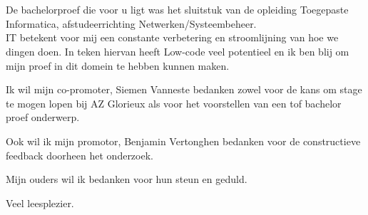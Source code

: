 
\chapter*{}
\label{ch:voorwoord}


De bachelorproef die voor u ligt was het sluitstuk van de opleiding Toegepaste Informatica, afstudeerrichting Netwerken/Systeembeheer.\\
IT betekent voor mij een constante verbetering en stroomlijning van hoe we dingen doen. In teken hiervan heeft Low-code veel potentieel en ik ben blij om mijn proef in dit domein te hebben kunnen maken.

Ik wil mijn co-promoter, Siemen Vanneste bedanken zowel voor de kans om stage te mogen lopen bij AZ Glorieux als voor het voorstellen van een tof bachelor proef onderwerp.

Ook wil ik mijn promotor, Benjamin Vertonghen bedanken voor de constructieve feedback doorheen het onderzoek.

Mijn ouders wil ik bedanken voor hun steun en geduld.

Veel leesplezier.
